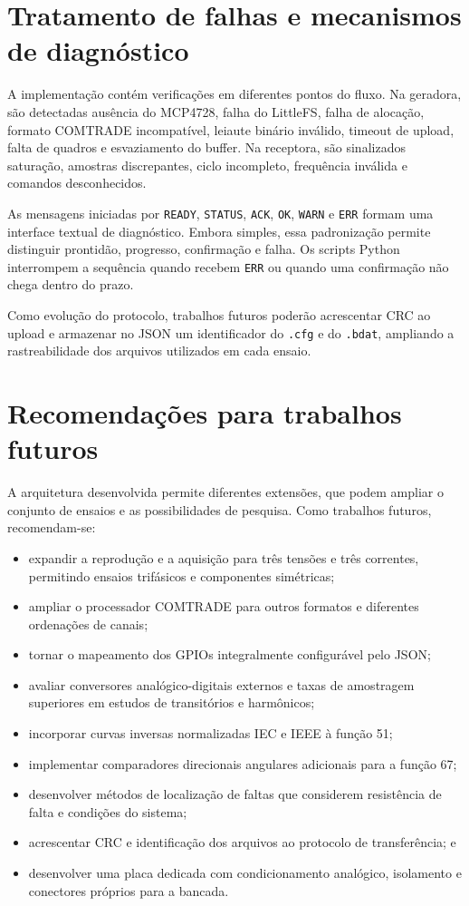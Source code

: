 \section{Tratamento de falhas e mecanismos de diagnóstico}

A implementação contém verificações em diferentes pontos do fluxo. Na geradora, são detectadas ausência do MCP4728, falha do LittleFS, falha de alocação, formato COMTRADE incompatível, leiaute binário inválido, timeout de upload, falta de quadros e esvaziamento do buffer. Na receptora, são sinalizados saturação, amostras discrepantes, ciclo incompleto, frequência inválida e comandos desconhecidos.

As mensagens iniciadas por \texttt{READY}, \texttt{STATUS}, \texttt{ACK}, \texttt{OK}, \texttt{WARN} e \texttt{ERR} formam uma interface textual de diagnóstico. Embora simples, essa padronização permite distinguir prontidão, progresso, confirmação e falha. Os scripts Python interrompem a sequência quando recebem \texttt{ERR} ou quando uma confirmação não chega dentro do prazo.

Como evolução do protocolo, trabalhos futuros poderão acrescentar CRC ao upload e armazenar no JSON um identificador do \texttt{.cfg} e do \texttt{.bdat}, ampliando a rastreabilidade dos arquivos utilizados em cada ensaio.

\section{Recomendações para trabalhos futuros}

A arquitetura desenvolvida permite diferentes extensões, que podem ampliar o conjunto de ensaios e as possibilidades de pesquisa. Como trabalhos futuros, recomendam-se:

\begin{itemize}
  \item expandir a reprodução e a aquisição para três tensões e três correntes, permitindo ensaios trifásicos e componentes simétricas;
  \item ampliar o processador COMTRADE para outros formatos e diferentes ordenações de canais;
  \item tornar o mapeamento dos GPIOs integralmente configurável pelo JSON;
  \item avaliar conversores analógico-digitais externos e taxas de amostragem superiores em estudos de transitórios e harmônicos;
  \item incorporar curvas inversas normalizadas IEC e IEEE à função 51;
  \item implementar comparadores direcionais angulares adicionais para a função 67;
  \item desenvolver métodos de localização de faltas que considerem resistência de falta e condições do sistema;
  \item acrescentar CRC e identificação dos arquivos ao protocolo de transferência; e
  \item desenvolver uma placa dedicada com condicionamento analógico, isolamento e conectores próprios para a bancada.
\end{itemize}

